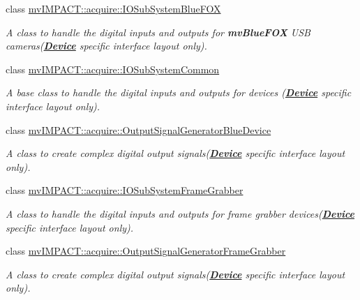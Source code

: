 \begin{DoxyCompactItemize}
class \hyperlink{classmv_i_m_p_a_c_t_1_1acquire_1_1_i_o_sub_system_blue_f_o_x}{mv\+I\+M\+P\+A\+C\+T\+::acquire\+::\+I\+O\+Sub\+System\+Blue\+F\+O\+X}
\begin{DoxyCompactList}\small\item\em A class to handle the digital inputs and outputs for {\bfseries mv\+Blue\+F\+O\+X} U\+S\+B cameras({\bfseries \hyperlink{classmv_i_m_p_a_c_t_1_1acquire_1_1_device}{Device}} specific interface layout only). \end{DoxyCompactList}\item 
class \hyperlink{classmv_i_m_p_a_c_t_1_1acquire_1_1_i_o_sub_system_common}{mv\+I\+M\+P\+A\+C\+T\+::acquire\+::\+I\+O\+Sub\+System\+Common}
\begin{DoxyCompactList}\small\item\em A base class to handle the digital inputs and outputs for devices ({\bfseries \hyperlink{classmv_i_m_p_a_c_t_1_1acquire_1_1_device}{Device}} specific interface layout only). \end{DoxyCompactList}\item 
class \hyperlink{classmv_i_m_p_a_c_t_1_1acquire_1_1_output_signal_generator_blue_device}{mv\+I\+M\+P\+A\+C\+T\+::acquire\+::\+Output\+Signal\+Generator\+Blue\+Device}
\begin{DoxyCompactList}\small\item\em A class to create complex digital output signals({\bfseries \hyperlink{classmv_i_m_p_a_c_t_1_1acquire_1_1_device}{Device}} specific interface layout only). \end{DoxyCompactList}\item 
class \hyperlink{classmv_i_m_p_a_c_t_1_1acquire_1_1_i_o_sub_system_frame_grabber}{mv\+I\+M\+P\+A\+C\+T\+::acquire\+::\+I\+O\+Sub\+System\+Frame\+Grabber}
\begin{DoxyCompactList}\small\item\em A class to handle the digital inputs and outputs for frame grabber devices({\bfseries \hyperlink{classmv_i_m_p_a_c_t_1_1acquire_1_1_device}{Device}} specific interface layout only). \end{DoxyCompactList}\item 
class \hyperlink{classmv_i_m_p_a_c_t_1_1acquire_1_1_output_signal_generator_frame_grabber}{mv\+I\+M\+P\+A\+C\+T\+::acquire\+::\+Output\+Signal\+Generator\+Frame\+Grabber}
\begin{DoxyCompactList}\small\item\em A class to create complex digital output signals({\bfseries \hyperlink{classmv_i_m_p_a_c_t_1_1acquire_1_1_device}{Device}} specific interface layout only). \end{DoxyCompactList}\item 

\end{DoxyCompactItemize}
